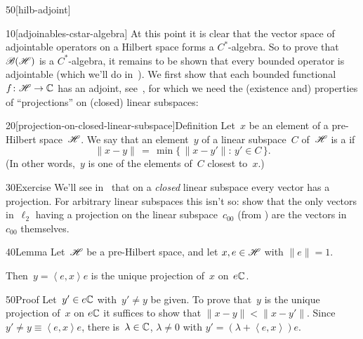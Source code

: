 \begin{parsec}{50}[hilb-adjoint]%
\begin{point}{10}[adjoinables-cstar-algebra]%
At this point
it is clear that the vector space of adjointable operators
on a Hilbert space forms a $C^*$-algebra.
So to prove that $\mathscr{B}(\mathscr{H})$
is a $C^*$-algebra,
it remains to be shown that every bounded operator
is adjointable (which we'll do in~).
We first show that each bounded functional $f\colon \mathscr{H}\to \mathbb{C}$
has an adjoint, see~,
for which we need the (existence and) properties of ``projections''
on (closed) linear subspaces:
\end{point}
\begin{point}{20}[projection-on-closed-linear-subspace]{Definition}
Let~$x$ be an element of a pre-Hilbert space~$\mathscr{H}$.
We say that an element~$y$ of a linear subspace~$C$
of~$\mathscr{H}$ is a %
if
\begin{equation*}
\|x-y\|\,=\,\min\{\,\|x-y'\|\colon \,y'\in C\,\}.
\end{equation*}
(In other words,~$y$ is one of the elements of~$C$ closest to~$x$.)
\end{point}
\begin{point}{30}{Exercise}%
We'll see in~
that on a \emph{closed}
linear subspace
every vector has a projection.
For arbitrary linear subspaces this
isn't so:
show that the only vectors in~$\ell_2$
having 
a projection on the linear subspace~$c_{00}$
(from )
are the vectors in~$c_{00}$ themselves.
\end{point}
\begin{point}{40}{Lemma}%
Let~$\mathscr{H}$ be a pre-Hilbert space,
and let $x,e\in\mathscr{H}$ with
$\|e\|=1$.

Then~$y=\left<e,x\right>e$ is the unique projection of~$x$ on~$e\mathbb{C}$.
\begin{point}{50}{Proof}%
Let~$y'\in e\mathbb{C}$
with~$y'\neq y$
be given.
To prove that~$y$
is the unique projection of~$x$ on $e\mathbb{C}$
it suffices to show that $\|x-y\|<\|x-y'\|$.
Since~$y'\neq y\equiv \left<e,x\right>e$,
there is~$\lambda\in \mathbb{C}$, $\lambda\neq 0$ 
with $y'=(\lambda+\left<e,x\right>)e$.


\end{point}
\end{point}
\end{parsec}
